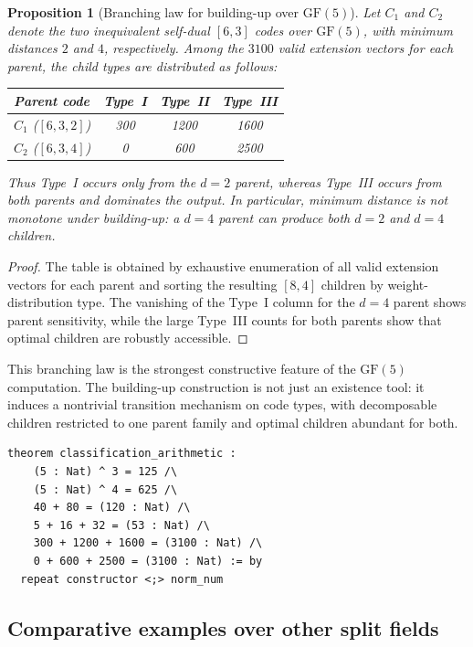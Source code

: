 \documentclass[12pt]{article}
\newtheorem{prop}[theorem]{Proposition}
\newcommand{\GF}[1]{\ensuremath{\mathrm{GF}(#1)}}
\begin{document}
\begin{prop}[Branching law for building-up over $\GF{5}$]
\label{prop:branching-gf5}
Let $C_1$ and $C_2$ denote the two inequivalent self-dual $[6,3]$ codes over $\GF{5}$, with minimum distances $2$ and $4$, respectively. Among the $3100$ valid extension vectors for each parent, the child types are distributed as follows:
\begin{center}
\begin{tabular}{lccc}
\toprule
Parent code & Type~I & Type~II & Type~III \\
\midrule
$C_1$ ($[6,3,2]$) & 300 & 1200 & 1600 \\
$C_2$ ($[6,3,4]$) & 0 & 600 & 2500 \\
\bottomrule
\end{tabular}
\end{center}
Thus Type~I occurs only from the $d=2$ parent, whereas Type~III occurs from both parents and dominates the output. In particular, minimum distance is not monotone under building-up: a $d=4$ parent can produce both $d=2$ and $d=4$ children.
\end{prop}

\begin{proof}
The table is obtained by exhaustive enumeration of all valid extension vectors for each parent and sorting the resulting $[8,4]$ children by weight-distribution type. The vanishing of the Type~I column for the $d=4$ parent shows parent sensitivity, while the large Type~III counts for both parents show that optimal children are robustly accessible.
\end{proof}

This branching law is the strongest constructive feature of the $\GF{5}$ computation. The building-up construction is not just an existence tool: it induces a nontrivial transition mechanism on code types, with decomposable children restricted to one parent family and optimal children abundant for both.

\begin{lstlisting}[caption={Lean 4: Classification arithmetic over GF(5)}]
theorem classification_arithmetic :
    (5 : Nat) ^ 3 = 125 /\
    (5 : Nat) ^ 4 = 625 /\
    40 + 80 = (120 : Nat) /\
    5 + 16 + 32 = (53 : Nat) /\
    300 + 1200 + 1600 = (3100 : Nat) /\
    0 + 600 + 2500 = (3100 : Nat) := by
  repeat constructor <;> norm_num
\end{lstlisting}

\subsection{Comparative examples over other split fields}
\end{document}
